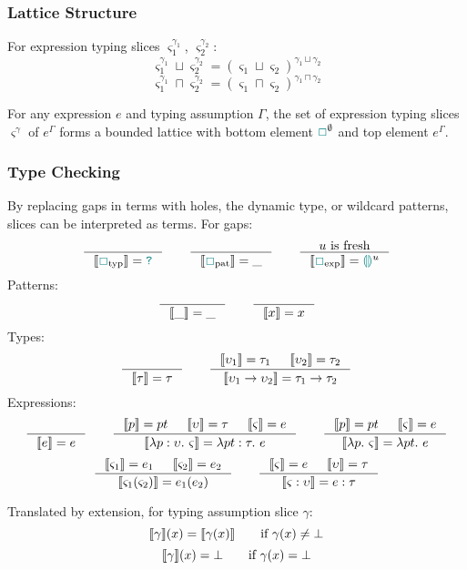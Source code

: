 \subsubsection{Lattice Structure}

\begin{definition}
For expression typing slices $\varsigma_1^{\gamma_1}$, $\varsigma_2^{\gamma_2}$:
\[\varsigma_1^{\gamma_1} \sqcup \varsigma_2^{\gamma_2} = (\varsigma_1 \sqcup \varsigma_2)^{\gamma_1 \sqcup \gamma_2}\]
\[\varsigma_1^{\gamma_1} \sqcap \varsigma_2^{\gamma_2} = (\varsigma_1 \sqcap \varsigma_2)^{\gamma_1 \sqcap \gamma_2}\]
\end{definition}

\begin{proposition}
For any expression $e$ and typing assumption $\Gamma$, the set of expression typing slices $\varsigma^{\gamma}$ of $e^{\Gamma}$ forms a bounded lattice with bottom element ${\color{teal}\Box}^{\emptyset}$ and top element $e^{\Gamma}$.
\end{proposition}

\subsubsection{Type Checking}
\begin{definition}
By replacing gaps in terms with holes, the dynamic type, or wildcard patterns, slices can be interpreted as terms. For gaps:
\[\inference{}{\type{\gap_{\text{typ}}} = \dyn} \qquad \inference{}{\type{\gap_{\text{pat}}} = \_} \qquad \inference{u\text{ is fresh}}{\type{\gap_{\text{exp}}} = \hole^u}\]
Patterns:
\[\inference{}{\type{\_} = \_} \qquad \inference{}{\type{x} = x}\]
Types:
\[\inference{}{\type{\tau} = \tau} \qquad \inference{\type{\upsilon_1} = \tau_1 & \type{\upsilon_2} = \tau_2}{\type{\upsilon_1 \to \upsilon_2} = \tau_1 \to \tau_2}\]
Expressions:
\[\inference{}{\type{e} = e} \qquad \inference{\type{p} = pt & \type{\upsilon} = \tau & \type{\varsigma} = e}{\type{\lambda p : \upsilon.\ \varsigma} = \lambda pt : \tau.\ e} \qquad \inference{\type{p} = pt & \type{\varsigma} = e}{\type{\lambda p.\ \varsigma} = \lambda pt.\ e}\]
\[\inference{\type{\varsigma_1} = e_1 & \type{\varsigma_2} = e_2}{\type{\varsigma_1(\varsigma_2)} = e_1(e_2)} \qquad \inference{\type{\varsigma} = e & \type{\upsilon} = \tau}{\type{\varsigma : \upsilon} = e : \tau}\]
\end{definition}
\begin{definition}
Translated by extension, for typing assumption slice $\gamma$:
\[\llbracket \gamma \rrbracket(x) = \llbracket \gamma(x) \rrbracket \qquad \text{if $\gamma(x) \neq \bot$}\]
\[\llbracket \gamma \rrbracket(x) = \bot \qquad \text{if $\gamma(x) = \bot$}\]
\end{definition}

